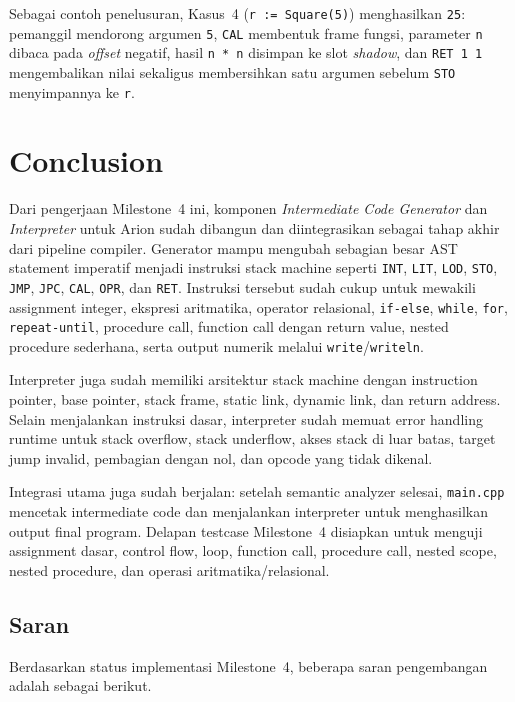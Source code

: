 \documentclass[11pt,a4paper]{article}
\begin{document}
Sebagai contoh penelusuran, Kasus~4 (\texttt{r := Square(5)}) menghasilkan
\texttt{25}: pemanggil mendorong argumen \texttt{5}, \texttt{CAL} membentuk frame
fungsi, parameter \texttt{n} dibaca pada \textit{offset} negatif, hasil
\texttt{n * n} disimpan ke slot \textit{shadow}, dan \texttt{RET 1 1}
mengembalikan nilai sekaligus membersihkan satu argumen sebelum \texttt{STO}
menyimpannya ke \texttt{r}.

\newpage
\section{Conclusion}

Dari pengerjaan Milestone~4 ini, komponen \textit{Intermediate Code Generator}
dan \textit{Interpreter} untuk Arion sudah dibangun dan diintegrasikan sebagai
tahap akhir dari pipeline compiler. Generator mampu mengubah sebagian besar AST
statement imperatif menjadi instruksi stack machine seperti \texttt{INT},
\texttt{LIT}, \texttt{LOD}, \texttt{STO}, \texttt{JMP}, \texttt{JPC},
\texttt{CAL}, \texttt{OPR}, dan \texttt{RET}. Instruksi tersebut sudah cukup
untuk mewakili assignment integer, ekspresi aritmatika, operator relasional,
\texttt{if-else}, \texttt{while}, \texttt{for}, \texttt{repeat-until},
procedure call, function call dengan return value, nested procedure sederhana,
serta output numerik melalui \texttt{write}/\texttt{writeln}.

Interpreter juga sudah memiliki arsitektur stack machine dengan instruction
pointer, base pointer, stack frame, static link, dynamic link, dan return
address. Selain menjalankan instruksi dasar, interpreter sudah memuat error
handling runtime untuk stack overflow, stack underflow, akses stack di luar
batas, target jump invalid, pembagian dengan nol, dan opcode yang tidak
dikenal.

Integrasi utama juga sudah berjalan: setelah semantic analyzer selesai,
\texttt{main.cpp} mencetak intermediate code dan menjalankan interpreter untuk
menghasilkan output final program. Delapan testcase Milestone~4 disiapkan untuk
menguji assignment dasar, control flow, loop, function call, procedure call,
nested scope, nested procedure, dan operasi aritmatika/relasional.

\subsection{Saran}

Berdasarkan status implementasi Milestone~4, beberapa saran pengembangan adalah
sebagai berikut.
\end{document}

